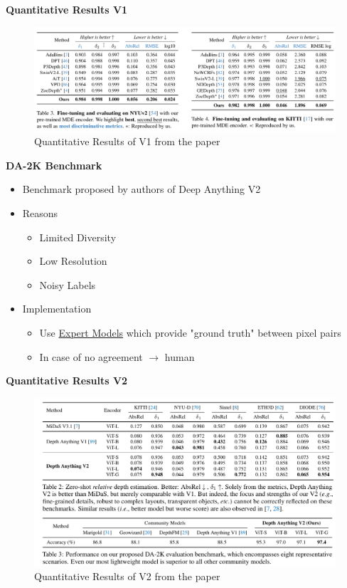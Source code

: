 \documentclass[12pt]{beamer}
\begin{document}
\begin{frame}[noframenumbering]        
    \textbf{Quantitative Results V1}
    \begin{figure}
        \centering
        \includegraphics[width=\textwidth]{./figures/screenshot_table-results_v1.png}
        \caption{Quantitative Results of V1 from the paper}
        \label{fig:res_quant_v1}
    \end{figure}
\end{frame}
\begin{frame}[noframenumbering]
    \scriptsize
    \textbf{DA-2K Benchmark}
    \begin{itemize}
        \item Benchmark proposed by authors of Deep Anything V2
        \item Reasons
        \begin{itemize}
            \item Limited Diversity
            \item Low Resolution
            \item Noisy Labels
        \end{itemize}
        \item Implementation
        \begin{itemize}
            \item Use \underline{Expert Models} which provide "ground truth" between pixel pairs
            \item In case of no agreement $\rightarrow$ human
        \end{itemize}
    \end{itemize}
\end{frame}
\begin{frame}[noframenumbering]        
    \textbf{Quantitative Results V2}
    \begin{figure}
        \centering
        \includegraphics[width=\textwidth]{./figures/screenshot_table-results_v2.png}
        \caption{Quantitative Results of V2 from the paper}
        \label{fig:res_quant_v2}
    \end{figure}
\end{frame}
    
\end{document}
